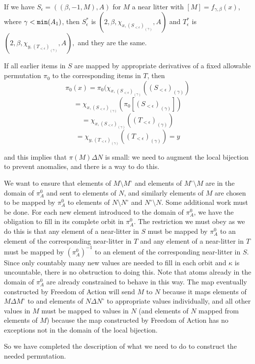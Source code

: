 \documentclass[112pt]{article}
\begin{document}
\begin{description}
If we have $S_\epsilon= ((\beta,-1,M),A)$ for $M$ a near litter with $[M] = f_{\gamma,\beta}(x)$, where $\gamma<{\tt min}(A_1)$,
then $S^*_\epsilon$ is $(2,\beta,\chi_{x,(S_{<\epsilon})_{(\gamma)}},A)$ and $T^*_\epsilon$ is $(2,\beta,\chi_{y,(T_{<\epsilon})_{(\gamma)}},A),$ and they are the same.

If all earlier items in $S$ are mapped by appropriate derivatives of a fixed allowable permutation $\pi_0$ to the corresponding items in $T$, then
$$\pi_0(x) = \pi_0(\chi_{x,(S_{<\epsilon})_{(\gamma)}}((S_{<\epsilon})_{(\gamma)}) $$ $$ = \chi_{x,(S_{<\epsilon})_{(\gamma)}}(\pi_0[(S_{<\epsilon})_{(\gamma)}])$$ $$ = \chi_{x,(S_{<\epsilon})_{(\gamma)}}((T_{<\epsilon})_{(\gamma)}) $$ $$= \chi_{y,(T_{<\epsilon})_{(\gamma)}}((T_{<\epsilon})_{(\gamma)})=y$$

and this implies that $\pi(M) \Delta N$ is small:  we need to augment the local bijection to prevent anomalies, and there is a way to do this.

We want to ensure that elements of $M \setminus M^{\circ}$ and elements of $M^{\circ} \setminus M$ are in the domain of $\pi^0_A$ and sent to elements of $N$, and similarly elements of $M$ are chosen to be mapped by $\pi^0_A$ to elements of $N\setminus N^\circ$ and $N^\circ \setminus N$.
 Some additional work must be done.  For each new element introduced to the domain of $\pi^0_A$, we have the obligation to fill in its complete orbit in $\pi^0_A$.   The restriction we must obey as we do this is that any element of a near-litter in $S$ must be mapped by $\pi^0_A$ to an element of the corresponding near-litter in $T$ and any element of a near-litter in $T$  must be mapped by $(\pi^0_A)^{-1}$ to an element of the corresponding near-litter in $S$.  Since only countably many new values are needed to fill in each orbit and $\kappa$ is uncountable, there is no obstruction to doing this.  Note that atoms already in the domain of $\pi^0_A$ are already constrained to behave in this way.  The map eventually constructed by Freedom of Action will send
$M$ to $N$ because it maps elements of $M \Delta M^\circ$ to and elements of $N \Delta N^{\circ}$ to appropriate values individually, and all other values in $M$ must be mapped to values in $N$ (and elements of $N$ mapped from elements of $M$) because the map constructed by Freedom of Action has no exceptions not in the domain of the local bijection.

So we have completed the description of what we need to do to construct the needed permutation.

\end{description}
\end{document}
